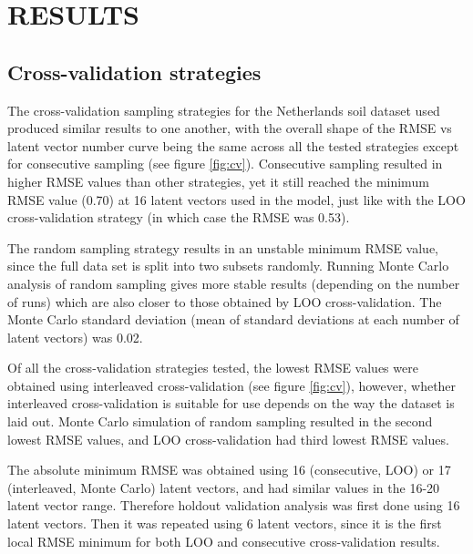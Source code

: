 \documentclass{isprs}
\begin{document}
\section{RESULTS}\label{sec:RESULTS}

\subsection{Cross-validation strategies}\label{sec:Cross-validation strategies 2}

The cross-validation sampling strategies for the Netherlands soil dataset used produced similar results to one another, with the overall shape of the RMSE vs latent vector number curve being the same across all the tested strategies except for consecutive sampling (see figure \ref{fig:cv}). Consecutive sampling resulted in higher RMSE values than other strategies, yet it still reached the minimum RMSE value (0.70) at 16 latent vectors used in the model, just like with the LOO cross-validation strategy (in which case the RMSE was 0.53).

The random sampling strategy results in an unstable minimum RMSE value, since the full data set is split into two subsets randomly. Running Monte Carlo analysis of random sampling gives more stable results (depending on the number of runs) which are also closer to those obtained by LOO cross-validation. The Monte Carlo standard deviation (mean of standard deviations at each number of latent vectors) was 0.02.

Of all the cross-validation strategies tested, the lowest RMSE values were obtained using interleaved cross-validation (see figure \ref{fig:cv}), however, whether interleaved cross-validation is suitable for use depends on the way the dataset is laid out. Monte Carlo simulation of random sampling resulted in the second lowest RMSE values, and LOO cross-validation had third lowest RMSE values.

The absolute minimum RMSE was obtained using 16 (consecutive, LOO) or 17 (interleaved, Monte Carlo) latent vectors, and had similar values in the 16-20 latent vector range. Therefore holdout validation analysis was first done using 16 latent vectors. Then it was repeated using 6 latent vectors, since it is the first local RMSE minimum for both LOO and consecutive cross-validation results.
\end{document}

